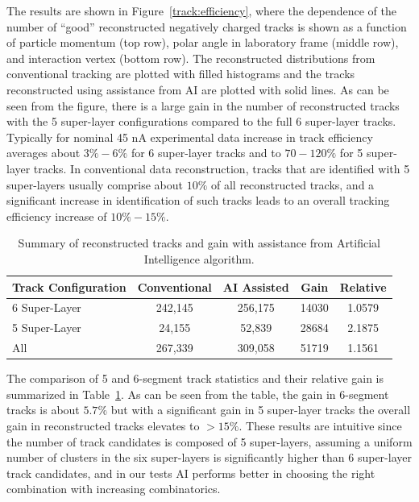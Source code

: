 \documentclass[aps,prl,preprint,12pt]{revtex4}
\begin{document}
The results are shown in Figure~\ref{track:efficiency}, where the dependence of the number 
of ``good'' reconstructed negatively charged tracks is shown as a function of particle 
momentum (top row), polar angle in laboratory frame (middle row), and interaction vertex 
(bottom row). The reconstructed distributions from conventional tracking are plotted with 
filled histograms and the tracks reconstructed using assistance from AI are plotted with 
solid lines. As can be seen from the figure, there is a large gain in the number of reconstructed 
tracks with the 5 super-layer configurations compared to the full 6 super-layer tracks. Typically 
for nominal 45 nA experimental data increase in track efficiency averages about $3\%-6\%$ 
for 6 super-layer tracks and to $70-120\%$ for 5 super-layer tracks. In conventional data 
reconstruction, tracks that are identified with 5 super-layers usually comprise about $10\%$ 
of all reconstructed tracks, and a significant increase in identification of such tracks leads to 
an overall tracking efficiency increase of $10\%-15\%$. 
 
 \begin{table}[!h]
 \begin{center}
 \begin{tabular}{|l|c|c|c|c|}
 \hline
 Track Configuration & Conventional & AI Assisted & Gain & Relative \\
 \hline
 \hline
 6 Super-Layer & 242,145 & 256,175 & 14030 & 1.0579 \\
 5 Super-Layer & 24,155 & 52,839 & 28684 & 2.1875 \\
 All & 267,339 & 309,058 & 51719 & 1.1561 \\
 \hline
 \end{tabular}
 \end{center}
 \caption{Summary of reconstructed tracks and gain with assistance from Artificial Intelligence algorithm.}
 \label{tbl:summary}
 \end{table}
 
The comparison of 5 and 6-segment track statistics and their relative gain is 
summarized in Table~\ref{tbl:summary}. As can be seen from the table, the 
gain in 6-segment tracks is about $5.7\%$ but with a significant gain in 5 super-layer tracks 
the overall gain in reconstructed tracks elevates to $>15\%$. These results are intuitive 
since the number of track candidates is composed of 5 super-layers, assuming a uniform 
number of clusters in the six super-layers is significantly higher than 6 super-layer track 
candidates, and in our tests AI performs better in choosing the right combination with 
increasing combinatorics.
 
\end{document}
